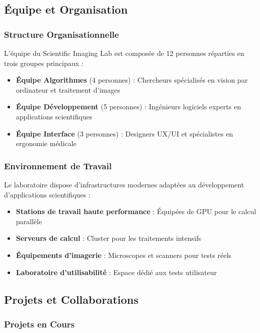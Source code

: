 \documentclass[12pt,a4paper]{article}
\begin{document}
\subsection{Équipe et Organisation}

\subsubsection{Structure Organisationnelle}

L'équipe du Scientific Imaging Lab est composée de 12 personnes réparties en trois groupes principaux :

\begin{itemize}
\item \textbf{Équipe Algorithmes} (4 personnes) : Chercheurs spécialisés en vision par ordinateur et traitement d'images
\item \textbf{Équipe Développement} (5 personnes) : Ingénieurs logiciels experts en applications scientifiques
\item \textbf{Équipe Interface} (3 personnes) : Designers UX/UI et spécialistes en ergonomie médicale
\end{itemize}

\subsubsection{Environnement de Travail}

Le laboratoire dispose d'infrastructures modernes adaptées au développement d'applications scientifiques :

\begin{itemize}
\item \textbf{Stations de travail haute performance} : Équipées de GPU pour le calcul parallèle
\item \textbf{Serveurs de calcul} : Cluster pour les traitements intensifs
\item \textbf{Équipements d'imagerie} : Microscopes et scanners pour tests réels
\item \textbf{Laboratoire d'utilisabilité} : Espace dédié aux tests utilisateur
\end{itemize}

\subsection{Projets et Collaborations}

\subsubsection{Projets en Cours}
\end{document}
